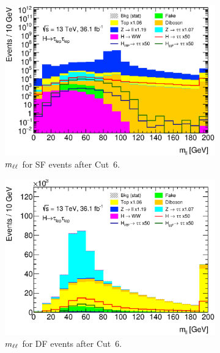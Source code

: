 \begin{figure}[htb]
    \centering
    \begin{subfigure}[t]{0.45\textwidth}
        \includegraphics[width=\textwidth]{./plots/event_selection/presel/eemm-CutOS-mvis-log.eps}
        \caption{$m_{\ell\ell}$ for SF events after Cut~6.}\label{fig:event_selection:cutflow:mllsf}
    \end{subfigure}
    \begin{subfigure}[t]{0.45\textwidth}
        \includegraphics[width=\textwidth]{./plots/event_selection/presel/emme-CutOS-mvis-lin.eps}
        \caption{$m_{\ell\ell}$ for DF events after Cut~6.}\label{fig:event_selection:cutflow:mlldf}
    \end{subfigure}
    \begin{subfigure}[t]{0.45\textwidth}

\end{subfigure}
\end{figure}
